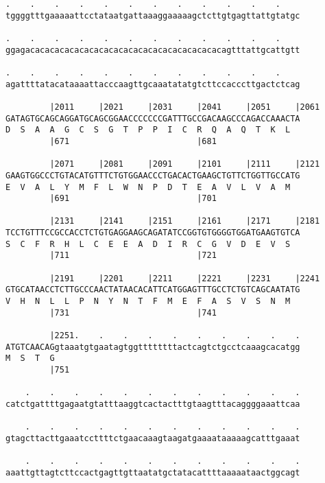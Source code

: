 \documentclass{article}
\begin{document}
\begin{Verbatim}
.    .    .    .    .    .    .    .    .    .    .    .    
tggggtttgaaaaattcctataatgattaaaggaaaaagctcttgtgagttattgtatgc
                                                            
.    .    .    .    .    .    .    .    .    .    .    .    
ggagacacacacacacacacacacacacacacacacacacacacagtttattgcattgtt
                                                            
.    .    .    .    .    .    .    .    .    .    .    .    
agattttatacataaaattacccaagttgcaaatatatgtcttccacccttgactctcag
                                                            
         |2011     |2021     |2031     |2041     |2051     |2061
GATAGTGCAGCAGGATGCAGCGGAACCCCCCCGATTTGCCGACAAGCCCAGACCAAACTA
D  S  A  A  G  C  S  G  T  P  P  I  C  R  Q  A  Q  T  K  L  
         |671                          |681                 
  
         |2071     |2081     |2091     |2101     |2111     |2121
GAAGTGGCCCTGTACATGTTTCTGTGGAACCCTGACACTGAAGCTGTTCTGGTTGCCATG
E  V  A  L  Y  M  F  L  W  N  P  D  T  E  A  V  L  V  A  M  
         |691                          |701                 
  
         |2131     |2141     |2151     |2161     |2171     |2181
TCCTGTTTCCGCCACCTCTGTGAGGAAGCAGATATCCGGTGTGGGGTGGATGAAGTGTCA
S  C  F  R  H  L  C  E  E  A  D  I  R  C  G  V  D  E  V  S  
         |711                          |721                 
  
         |2191     |2201     |2211     |2221     |2231     |2241
GTGCATAACCTCTTGCCCAACTATAACACATTCATGGAGTTTGCCTCTGTCAGCAATATG
V  H  N  L  L  P  N  Y  N  T  F  M  E  F  A  S  V  S  N  M  
         |731                          |741                 
  
         |2251.    .    .    .    .    .    .    .    .    .
ATGTCAACAGgtaaatgtgaatagtggttttttttactcagtctgcctcaaagcacatgg
M  S  T  G                                                  
         |751                                               
  
    .    .    .    .    .    .    .    .    .    .    .    .
catctgattttgagaatgtatttaaggtcactactttgtaagtttacaggggaaattcaa
                                                            
    .    .    .    .    .    .    .    .    .    .    .    .
gtagcttacttgaaatccttttctgaacaaagtaagatgaaaataaaaagcatttgaaat
                                                            
    .    .    .    .    .    .    .    .    .    .    .    .
aaattgttagtcttccactgagttgttaatatgctatacattttaaaaataactggcagt
                                                            

\end{Verbatim}
\end{document}
